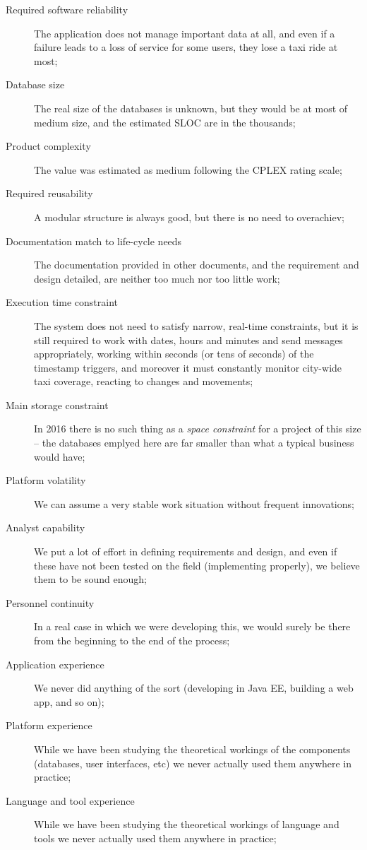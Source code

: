 \begin{description}
\item[Required software reliability] The application does not manage important data at all, and even if a failure leads to a loss of service for some users, they lose a taxi ride at most;
\item[Database size] The real size of the databases is unknown, but they would be at most of medium size, and the estimated SLOC are in the thousands;
\item[Product complexity] The value was estimated as medium following the CPLEX rating scale;
\item[Required reusability] A modular structure is always good, but there is no need to overachiev;
\item[Documentation match to life-cycle needs] The documentation provided in other documents, and the requirement and design detailed, are neither too much nor too little work;
\item[Execution time constraint] The system does not need to satisfy narrow, real-time constraints, but it is still required to work with dates, hours and minutes and send messages appropriately, working within seconds (or tens of seconds) of the timestamp triggers, and moreover it must constantly monitor city-wide taxi coverage, reacting to changes and movements;
\item[Main storage constraint] In 2016 there is no such thing as a \emph{space constraint} for a project of this size -- the databases emplyed here are far smaller than what a typical business would have;
\item[Platform volatility] We can assume a very stable work situation without frequent innovations;
\item[Analyst capability] We put a lot of effort in defining requirements and design, and even if these have not been tested on the field (implementing properly), we believe them to be sound enough;
\item[Personnel continuity] In a real case in which we were developing this, we would surely be there from the beginning to the end of the process;
\item[Application experience] We never did anything of the sort (developing in Java EE, building a web app, and so on);
\item[Platform experience] While we have been studying the theoretical workings of the components (databases, user interfaces, etc) we never actually used them anywhere in practice;
\item[Language and tool experience] While we have been studying the theoretical workings of language and tools we never actually used them anywhere in practice;

\end{description}
